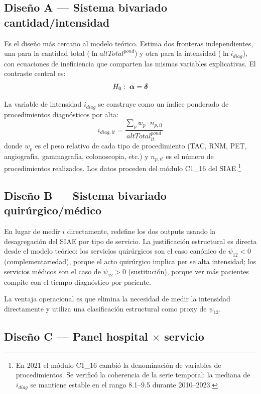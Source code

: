\subsection{Diseño A --- Sistema bivariado cantidad/intensidad}

Es el diseño más cercano al modelo teórico. Estima dos fronteras independientes, una para la cantidad total ($\ln altTotal^{pond}$) y otra para la intensidad ($\ln i_{diag}$), con ecuaciones de ineficiencia que comparten las mismas variables explicativas. El contraste central es:
\begin{equation}
  H_0:\; \boldsymbol{\alpha} = \boldsymbol{\delta}
  \label{eq:h0_pstar}
\end{equation}

La variable de intensidad $i_{diag}$ se construye como un índice ponderado de procedimientos diagnósticos por alta:
\begin{equation}
  i_{diag,it} = \frac{\sum_p w_p \cdot n_{p,it}}{altTotal^{pond}_{it}}
  \label{eq:i_diag}
\end{equation}
donde $w_p$ es el peso relativo de cada tipo de procedimiento (TAC, RNM, PET, angiografía, gammagrafía, colonoscopia, etc.) y $n_{p,it}$ es el número de procedimientos realizados. Los datos proceden del módulo C1\_16 del SIAE.\footnote{En 2021 el módulo C1\_16 cambió la denominación de variables de procedimientos. Se verificó la coherencia de la serie temporal: la mediana de $i_{diag}$ se mantiene estable en el rango 8.1--9.5 durante 2010--2023.}

\subsection{Diseño B --- Sistema bivariado quirúrgico/médico}

En lugar de medir $i$ directamente, redefine los dos outputs usando la desagregación del SIAE por tipo de servicio. La justificación estructural es directa desde el modelo teórico: los servicios quirúrgicos son el caso canónico de $\psi_{12} < 0$ (complementariedad), porque el acto quirúrgico implica per se alta intensidad; los servicios médicos son el caso de $\psi_{12} > 0$ (sustitución), porque ver más pacientes compite con el tiempo diagnóstico por paciente.

La ventaja operacional es que elimina la necesidad de medir la intensidad directamente y utiliza una clasificación estructural como proxy de $\psi_{12}$.

\subsection{Diseño C --- Panel hospital \texorpdfstring{$\times$}{x} servicio}

